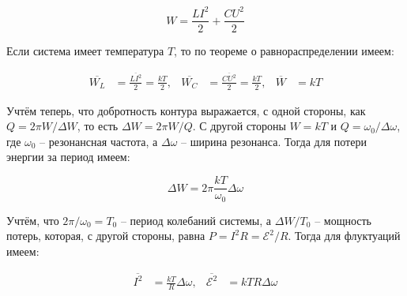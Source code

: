 \begin{equation*}
    W = \frac{L I^2}{2} + \frac{C U^2}{2}
\end{equation*}

\noindent
Если система имеет температура $T$, то по теореме о равнораспределении имеем:

\begin{align*}
    \overline{W_L} &= \frac{\overline{L I^2}}{2} = \frac{k T}{2}, & \overline{W_C} &= \frac{\overline{C U^2}}{2} = \frac{k T}{2}, & \overline{W} &= k T
\end{align*}

\noindent
Учтём теперь, что добротность контура выражается, с одной стороны, как $Q = 2 \pi W / \Delta W$, то есть $\Delta W = 2 \pi W / Q$. С другой стороны $W = k T$ и $Q = \omega_0 / \Delta \omega$, где $\omega_0$ -- резонансная частота, а $\Delta \omega$ -- ширина резонанса. Тогда для потери энергии за период имеем:

\begin{equation*}
    \Delta W = 2 \pi \frac{k T}{\omega_0} \Delta \omega
\end{equation*}

\noindent
Учтём, что $2 \pi / \omega_0 = T_0$ -- период колебаний системы, а $\Delta W / T_0$ -- мощность потерь, которая, с другой стороны, равна $P = I^2 R = \mathcal{E}^2 / R$. Тогда для флуктуаций имеем:

\begin{align}
    \overline{I^2} &= \frac{k T}{R} \Delta \omega, & \overline{\mathcal{E}^2} &= k T R \Delta \omega
\end{align}